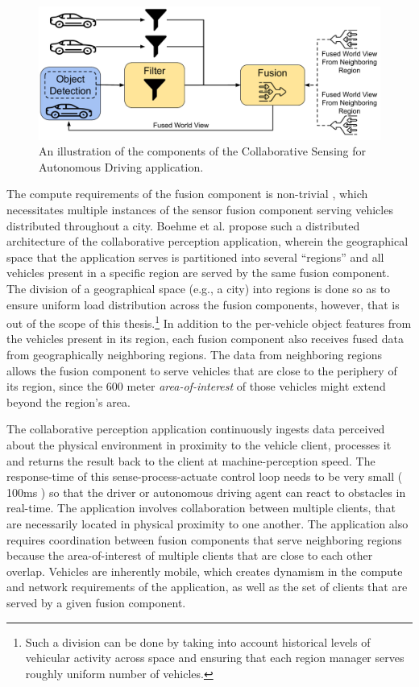 \begin{figure}
\centering
\includegraphics[width=0.8\linewidth]{figures/oneedge/collaborative_driving_app.pdf}
\caption{An illustration of the components of the Collaborative Sensing for Autonomous Driving application.}
\label{fig:mapfusion_app_model}
\end{figure}

\par The compute requirements of the fusion component is non-trivial \cite{fusioneye}, which necessitates multiple instances of the sensor fusion component serving vehicles distributed throughout a city. Boehme et al. \cite{talkycars} propose such a distributed architecture of the collaborative perception application, wherein the geographical space that the application serves is partitioned into several ``regions'' and all vehicles present in a specific region are served by the same fusion component. The division of a geographical space (e.g., a city) into regions is done so as to ensure uniform load distribution across the fusion components, however, that is out of the scope of this thesis.\footnote{Such a division can be done by taking into account historical levels of vehicular activity across space and ensuring that each region manager serves roughly uniform number of vehicles.} In addition to the per-vehicle object features from the vehicles present in its region, each fusion component also receives fused data from geographically neighboring regions. The data from neighboring regions allows the fusion component to serve vehicles that are close to the periphery of its region, since the 600 meter \textit{area-of-interest} of those vehicles might extend beyond the region's area. 

\par The collaborative perception application continuously ingests data perceived about the physical environment in proximity to the vehicle client, processes it and returns the result back to the client at machine-perception speed. The response-time of this sense-process-actuate control loop needs to be very small (~ 100ms \cite{fcooper_or_fusioneye}) so that the driver or autonomous driving agent can react to obstacles in real-time. The application involves collaboration between multiple clients, that are necessarily located in physical proximity to one another. The application also requires coordination between fusion components that serve neighboring regions because the area-of-interest of multiple clients that are close to each other overlap. Vehicles are inherently mobile, which creates dynamism in the compute and network requirements of the application, as well as the set of clients that are served by a given fusion component. 

